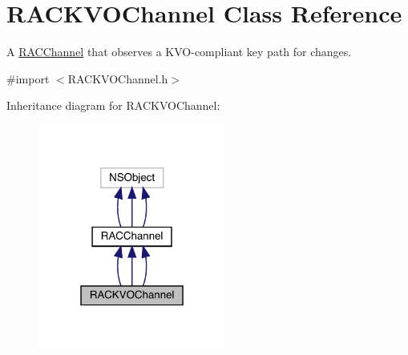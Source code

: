\hypertarget{interface_r_a_c_k_v_o_channel}{}\section{R\+A\+C\+K\+V\+O\+Channel Class Reference}
\label{interface_r_a_c_k_v_o_channel}


A \mbox{\hyperlink{interface_r_a_c_channel}{R\+A\+C\+Channel}} that observes a K\+V\+O-\/compliant key path for changes.  




{\ttfamily \#import $<$R\+A\+C\+K\+V\+O\+Channel.\+h$>$}



Inheritance diagram for R\+A\+C\+K\+V\+O\+Channel\+:\nopagebreak
\begin{figure}[H]
\begin{center}
\leavevmode
\includegraphics[width=175pt]{interface_r_a_c_k_v_o_channel__inherit__graph}
\end{center}
\end{figure}


